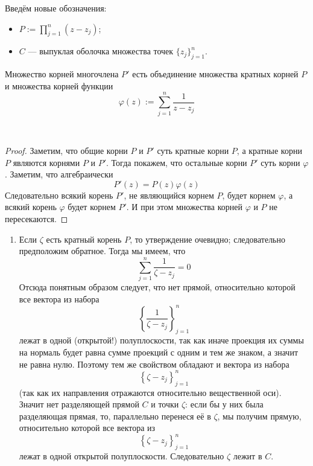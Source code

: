 \documentclass[12pt,a4paper]{article}
\begin{document}
    \begin{enumproblem}\ItemedProblem
        Введём новые обозначения:
        \begin{itemize}
            \item $P := \prod_{j=1}^n (z - z_j)$;
            \item $C$ --- выпуклая оболочка множества точек $\{z_j\}_{j=1}^n$.
        \end{itemize}

        \begin{lemma}
            Множество корней многочлена $P'$ есть объединение множества кратных корней $P$ и множества корней функции
            \[\varphi(z) := \sum_{j=1}^n \frac{1}{z - z_j}\]
        \end{lemma}\
        
        \begin{proof}
            Заметим, что общие корни $P$ и $P'$ суть кратные корни $P$, а кратные корни $P$ являются корнями $P$ и $P'$. Тогда покажем, что остальные корни $P'$ суть корни $\varphi$. Заметим, что алгебраически
            \[P'(z) = P(z) \varphi(z)\]
            Следовательно всякий корень $P'$, не являющийся корнем $P$, будет корнем $\varphi$, а всякий корень $\varphi$ будет корнем $P'$. И при этом множества корней $\varphi$ и $P$ не пересекаются.
        \end{proof}

        \begin{enumerate}
            \item Если $\zeta$ есть кратный корень $P$, то утверждение очевидно; следовательно предположим обратное. Тогда мы имеем, что
                \[\sum_{j=1}^n \frac{1}{\zeta - z_j} = 0\]
                Отсюда понятным образом следует, что нет прямой, относительно которой все вектора из набора
                \[\left\{\frac{1}{\zeta - z_j}\right\}_{j=1}^n\]
                лежат в одной (открытой!) полуплоскости, так как иначе проекция их суммы на нормаль будет равна сумме проекций с одним и тем же знаком, а значит не равна нулю. Поэтому тем же свойством обладают и вектора из набора
                \[\left\{\zeta - z_j\right\}_{j=1}^n\]
                (так как их направления отражаются относительно вещественной оси). Значит нет разделяющей прямой $C$ и точки $\zeta$: если бы у них была разделяющая прямая, то, параллельно перенеся её в $\zeta$, мы получим прямую, относительно которой все вектора из
                \[\left\{\zeta - z_j\right\}_{j=1}^n\]
                лежат в одной открытой полуплоскости. Следовательно $\zeta$ лежит в $C$.
            

\end{enumerate}
\end{enumproblem}
\end{document}
